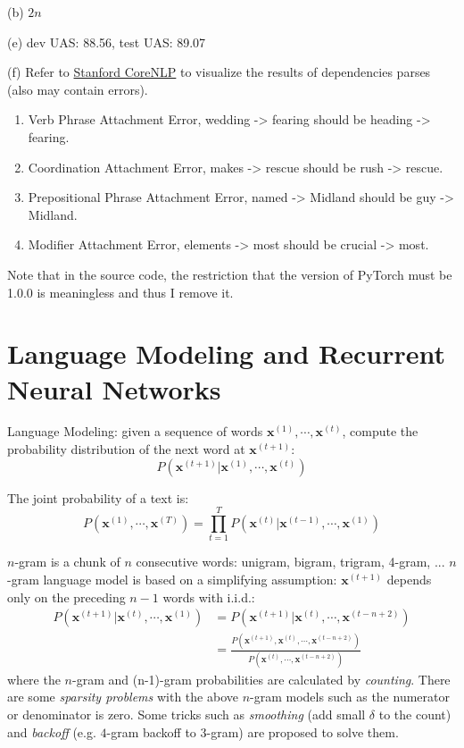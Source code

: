 (b) $2n$

(e) dev UAS: 88.56, test UAS: 89.07

(f) Refer to \href{https://corenlp.run/}{Stanford CoreNLP} to visualize the results of dependencies parses (also may contain errors).
\begin{enumerate}[label=(\roman*)]
	\item Verb Phrase Attachment Error, wedding -> fearing should be heading -> fearing.
	\item Coordination Attachment Error, makes -> rescue should be rush -> rescue.
	\item Prepositional Phrase Attachment Error, named -> Midland should be guy -> Midland.
	\item Modifier Attachment Error, elements -> most should be crucial -> most.
\end{enumerate}

Note that in the source code, the restriction that the version of PyTorch must be 1.0.0 is meaningless and thus I remove it.

\section{Language Modeling and Recurrent Neural Networks}

Language Modeling: given a sequence of words $\bm{x}^{(1)}, \cdots, \bm{x}^{(t)}$, compute the probability distribution of the next word at $\bm{x}^{(t+1)}$:
\begin{equation}
P(\bm{x}^{(t+1)} | \bm{x}^{(1)}, \cdots, \bm{x}^{(t)})
\end{equation}

The joint probability of a text is:
\begin{equation}
P(\bm{x}^{(1)}, \cdots, \bm{x}^{(T)}) = \prod_{t=1}^T P(\bm{x}^{(t)} | \bm{x}^{(t-1)}, \cdots, \bm{x}^{(1)})
\end{equation}

$n$-gram is a chunk of $n$ consecutive words: unigram, bigram, trigram, 4-gram, ...
$n$-gram language model is based on a simplifying assumption: $\bm{x}^{(t+1)}$ depends only on the preceding $n-1$ words with i.i.d.:
\begin{align}
P(\bm{x}^{(t+1)} | \bm{x}^{(t)}, \cdots, \bm{x}^{(1)}) &= P(\bm{x}^{(t+1)} | \bm{x}^{(t)}, \cdots, \bm{x}^{(t-n+2)}) \nonumber \\
&= \frac{P(\bm{x}^{(t+1)}, \bm{x}^{(t)}, \cdots, \bm{x}^{(t-n+2)})}{P(\bm{x}^{(t)}, \cdots, \bm{x}^{(t-n+2)})} \nonumber
\end{align}
where the $n$-gram and (n-1)-gram probabilities are calculated by \emph{counting}.
There are some \emph{sparsity problems} with the above $n$-gram models such as the numerator or denominator is zero.
Some tricks such as \emph{smoothing} (add small $\delta$ to the count) and \emph{backoff} (e.g. $4$-gram backoff to $3$-gram) are proposed to solve them.


